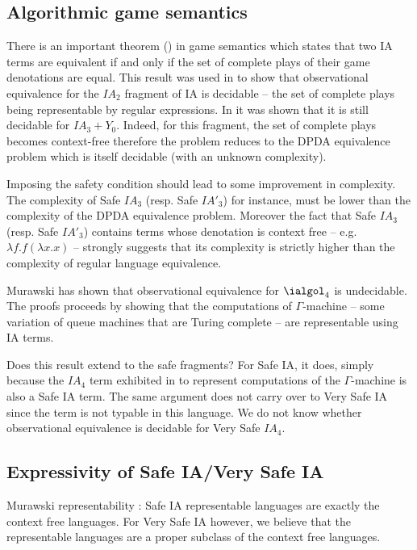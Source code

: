 \subsection{Algorithmic game semantics}

There is an important theorem (\cite{AM97a}) in game semantics
which states that two IA terms are equivalent if and only if the set
of complete plays of their game denotations are equal. This result was used in \cite{ghicamccusker00} to show that observational
equivalence for the $IA_2$ fragment of IA is decidable -- the set of
complete plays being representable by regular expressions. In
\cite{Ong02} it was shown that it is still decidable
 for $IA_3+Y_0$. Indeed, for this fragment, the set of complete plays becomes context-free
therefore the problem reduces to the DPDA equivalence problem which
is itself decidable (with an unknown complexity).

Imposing the safety condition should lead to some improvement in
complexity. The complexity of  Safe $IA_3$ (resp. Safe $IA'_3$) for
instance, must be lower than the complexity of the DPDA equivalence
problem. Moreover the fact that Safe $IA_3$ (resp. Safe $IA'_3$)
contains terms whose denotation is context free -- e.g. $\lambda f .
f (\lambda x .x )$ -- strongly suggests that its complexity is
strictly higher than the complexity of regular language equivalence.

Murawski \cite{Murawski2003} has shown that observational
equivalence for $\ialgol_4$ is undecidable. The proofs proceeds by
showing that the computations of $\Gamma$-machine -- some variation
of queue machines that are Turing complete -- are representable
using IA terms.

Does this result extend to the safe fragments? For Safe IA, it does,
simply because the $IA_4$ term exhibited in \cite{Murawski2003} to
represent computations of the $\Gamma$-machine is also a Safe IA
term. The same argument does not carry over to Very Safe IA since
the term is not typable in this language. We do not know whether
observational equivalence is decidable for Very Safe $IA_4$.



\subsection{Expressivity of Safe IA/Very Safe IA}

Murawski representability : Safe IA representable languages are
exactly the context free languages. For Very Safe IA however, we
believe that the representable languages are a proper subclass of
the context free languages.








